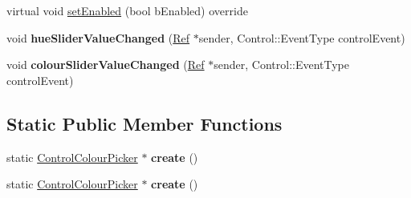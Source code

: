 \begin{DoxyCompactItemize}
virtual void \hyperlink{classControlColourPicker_a233d6048e0899b35f23aaa557a839069}{set\+Enabled} (bool b\+Enabled) override
\item 
\mbox{\label{classControlColourPicker_aa7b6798496b8a034114a63823ea02f48}} 
void {\bfseries hue\+Slider\+Value\+Changed} (\hyperlink{classRef}{Ref} $\ast$sender, Control\+::\+Event\+Type control\+Event)
\item 
\mbox{\label{classControlColourPicker_a48cf2cfec3297c34f3d24238474cb4ec}} 
void {\bfseries colour\+Slider\+Value\+Changed} (\hyperlink{classRef}{Ref} $\ast$sender, Control\+::\+Event\+Type control\+Event)
\end{DoxyCompactItemize}
\subsection*{Static Public Member Functions}
\begin{DoxyCompactItemize}
\item 
\mbox{\label{classControlColourPicker_a2371a5edcb442a2ef2712b5570aba32d}} 
static \hyperlink{classControlColourPicker}{Control\+Colour\+Picker} $\ast$ {\bfseries create} ()
\item 
\mbox{\label{classControlColourPicker_a82fd4e5eacb011f22cae53506d7ea431}} 
static \hyperlink{classControlColourPicker}{Control\+Colour\+Picker} $\ast$ {\bfseries create} ()
\end{DoxyCompactItemize}
